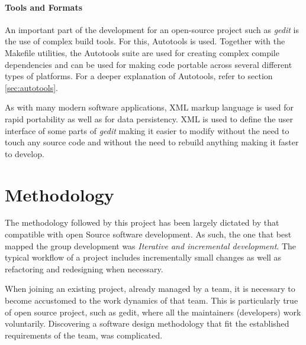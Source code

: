 \paragraph{Tools and Formats}


An important part of the development for an open-source project such as \emph{gedit} is 
the use of complex build tools.   For this, Autotools is used. 
Together with the Makefile utilities, the Autotools suite are used for creating complex
compile dependencies and can be used for making code portable across several different 
types of platforms. For a deeper explanation of Autotools, refer to section \ref{sec:autotools}.

As with many modern software applications, XML markup language is used for 
rapid portability as well as for data persistency. XML is used to 
define the user interface of some parts of \emph{gedit} making it easier to
modify without the need to touch any source code and without the need to 
rebuild anything making it faster to develop.


\section{Methodology}\label{sec:Methodology}

The methodology followed by this project has been largely dictated by that compatible 
with open Source software development.    As such, the one that best mapped the group 
development was  \emph{Iterative and incremental development}.
The typical workflow of a  \GNOME project includes incrementally small changes 
as well as refactoring and redesigning when necessary.

When joining an existing project, already managed by a team, it is necessary to become accustomed 
to the work dynamics of that team. This is particularly true of open source project, such as gedit, 
where all the maintainers (developers) work voluntarily.  Discovering a software design methodology 
that fit the established requirements of the team, was complicated.



